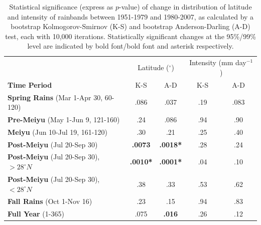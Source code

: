 \documentclass{ametsoc}
\begin{document}
\begin{table}[p]

\centering

\caption{Statistical significance (express as $p$-value) of change in distribution of latitude and intensity of rainbands between 1951-1979 and 1980-2007, as calculated by a bootstrap Kolmogorov-Smirnov (K-S) and bootstrap Anderson-Darling (A-D) test, each with 10,000 iterations. Statistically significant changes at the 95\%/99\% level are indicated by bold font/bold font and asterisk respectively.}

\begin{tabular}{ l c c c c}
												& \multicolumn{2}{c}{Latitude ($^\circ$)} & \multicolumn{2}{c}{Intensity  (mm day$^{-1}$)} \\
	 \textbf{Time Period} 							& K-S 			& A-D 			& K-S 	& A-D \\
	 \hline
	\textbf{Spring Rains} (Mar 1-Apr 30, 60-120)  		& .086			& .037			& .19	& .083 \\
	\textbf{Pre-Meiyu} (May 1-Jun 9, 121-160)  		& .24 			&  .086 			& .94	& .90 \\
	\textbf{Meiyu} (Jun 10-Jul 19, 161-120)			& .30			&  .21			&  .25	& .40 \\	
	\textbf{Post-Meiyu} (Jul 20-Sep 30) 				& \textbf{.0073}	&  \textbf{.0018*}  	&  .28 	& .24 \\
	\textbf{Post-Meiyu} (Jul 20-Sep 30), $>28^{\circ}N$   & \textbf{.0010*}	&  \textbf{.0001*} 	&  .04 	& .10 \\	
	\textbf{Post-Meiyu} (Jul 20-Sep 30), $<28^{\circ}N$   & .38			&  .33			&  .53	& .62 \\	
	\textbf{Fall Rains} (Oct 1-Nov 16) 					& .23 			&  .15			&  .94 	& .83 \\	
	\textbf{Full Year} (1-365)						& .075			&  \textbf{.016} 	&  .26 	& .12 \\	
	
\end{tabular}
\label{tab:t313}
\end{table}
\end{document}
